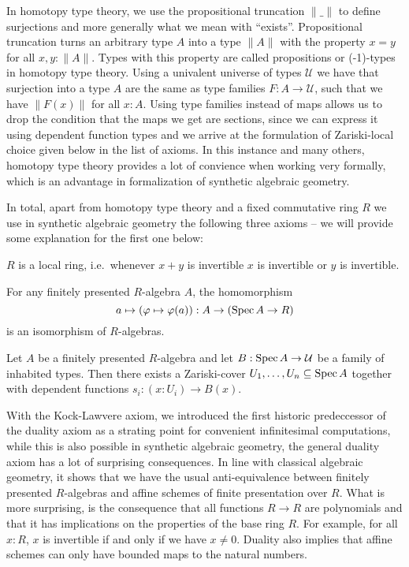 In homotopy type theory, we use the propositional truncation $\|\_\|$ to define surjections and more generally what we mean with ``exists''.
Propositional truncation turns an arbitrary type $A$ into a type $\|A\|$ with the property $x=y$ for all $x,y:\|A\|$.
Types with this property are called propositions or (-1)-types in homotopy type theory.
Using a univalent universe of types $\mathcal U$ we have that surjection into a type $A$ are the same as type families $F:A\to \mathcal U$, such that we have $\|F(x)\|$ for all $x: A$.
Using type families instead of maps allows us to drop the condition that the maps we get are sections, since we can express it using dependent function types and we arrive at the formulation of Zariski-local choice given below in the list of axioms.
In this instance and many others, homotopy type theory provides a lot of convience when working very formally, which is an advantage in formalization of synthetic algebraic geometry.

In total, apart from homotopy type theory and a fixed commutative ring $R$ we use in synthetic algebraic geometry the following three axioms -- we will provide some explanation for the first one below:

\begin{center}
\begin{axiom}[Locality]%
  \label{loc-axiom}
  $R$ is a local ring, i.e.\ whenever $x+y$ is invertible $x$ is invertible or $y$ is invertible.
\end{axiom}

\begin{axiom}[Duality]%
  \label{duality-axiom}
  For any finitely presented $R$-algebra $A$, the homomorphism
  \[ a \mapsto (\varphi\mapsto \varphi(a)) : A \to (\operatorname{Spec} A \to R)\]
  is an isomorphism of $R$-algebras.
\end{axiom}

\begin{axiom}%
  \label{Z-choice-axiom}
  Let $A$ be a finitely presented $R$-algebra
  and let $B : \operatorname{Spec} A \to \mathcal{U}$ be a family of inhabited types.
  Then there exists a Zariski-cover $U_1,\dots,U_n\subseteq \operatorname{Spec} A$
  together with dependent functions $s_i : (x : U_i)\to B(x)$.
\end{axiom}
\end{center}

With the Kock-Lawvere axiom, we introduced the first historic predeccessor of the duality axiom as a strating point for convenient infinitesimal computations,
while this is also possible in synthetic algebraic geometry, the general duality axiom has a lot of surprising consequences.
In line with classical algebraic geometry, it shows that we have the usual anti-equivalence between finitely presented $R$-algebras and affine schemes of finite presentation over $R$.
What is more surprising, is the consequence that all functions $R\to R$ are polynomials and that it has implications on the properties of the base ring $R$.
For example, for all $x:R$, $x$ is invertible if and only if we have $x\neq 0$.
Duality also implies that affine schemes can only have bounded maps to the natural numbers.

